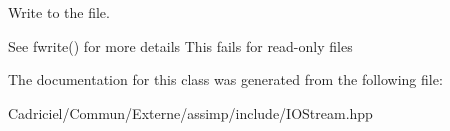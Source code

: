 Write to the file. 

See fwrite() for more details This fails for read-\/only files 

The documentation for this class was generated from the following file\+:\begin{DoxyCompactItemize}
\item 
Cadriciel/\+Commun/\+Externe/assimp/include/I\+O\+Stream.\+hpp\end{DoxyCompactItemize}
